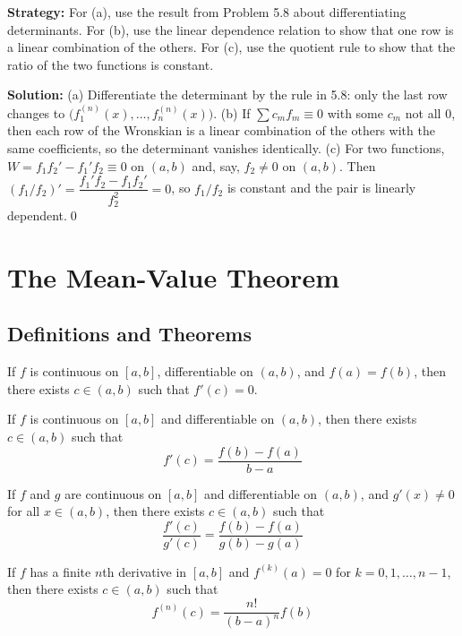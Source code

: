 \noindent\textbf{Strategy:} For (a), use the result from Problem 5.8 about differentiating determinants. For (b), use the linear dependence relation to show that one row is a linear combination of the others. For (c), use the quotient rule to show that the ratio of the two functions is constant.

\bigskip\noindent\textbf{Solution:}
(a) Differentiate the determinant by the rule in 5.8: only the last row changes to $\big(f_1^{(n)}(x),\dots,f_n^{(n)}(x)\big)$. (b) If $\sum c_m f_m\equiv 0$ with some $c_m$ not all $0$, then each row of the Wronskian is a linear combination of the others with the same coefficients, so the determinant vanishes identically. (c) For two functions, $W=f_1 f_2'-f_1'f_2\equiv 0$ on $(a,b)$ and, say, $f_2\ne 0$ on $(a,b)$. Then $(f_1/f_2)'=\dfrac{f_1'f_2-f_1 f_2'}{f_2^2}=0$, so $f_1/f_2$ is constant and the pair is linearly dependent.\qed

\section{The Mean-Value Theorem}

\subsection*{Definitions and Theorems}

\begin{theorem}
If $f$ is continuous on $[a,b]$, differentiable on $(a,b)$, and $f(a) = f(b)$, then there exists $c \in (a,b)$ such that $f'(c) = 0$.
\end{theorem}

\begin{theorem}
If $f$ is continuous on $[a,b]$ and differentiable on $(a,b)$, then there exists $c \in (a,b)$ such that
\[ f'(c) = \frac{f(b) - f(a)}{b - a} \]
\end{theorem}

\begin{theorem}
If $f$ and $g$ are continuous on $[a,b]$ and differentiable on $(a,b)$, and $g'(x) \neq 0$ for all $x \in (a,b)$, then there exists $c \in (a,b)$ such that
\[ \frac{f'(c)}{g'(c)} = \frac{f(b) - f(a)}{g(b) - g(a)} \]
\end{theorem}

\begin{theorem}
If $f$ has a finite $n$th derivative in $[a,b]$ and $f^{(k)}(a) = 0$ for $k = 0, 1, \ldots, n-1$, then there exists $c \in (a,b)$ such that
\[ f^{(n)}(c) = \frac{n!}{(b-a)^n} f(b) \]
\end{theorem}

